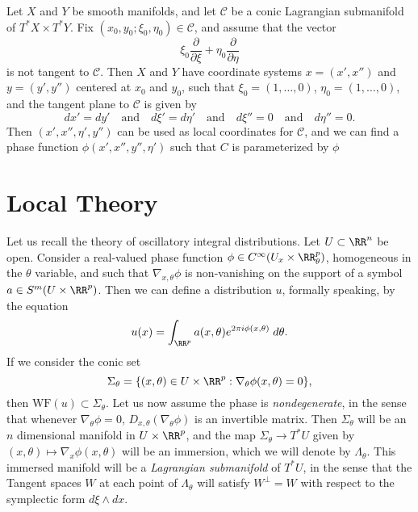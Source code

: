 \begin{lemma}
    Let $X$ and $Y$ be smooth manifolds, and let $\mathcal{C}$ be a conic Lagrangian submanifold of $T^* X \times T^* Y$. Fix $(x_0,y_0;\xi_0,\eta_0) \in \mathcal{C}$, and assume that the vector
    \[ \xi_0 \frac{\partial}{\partial \xi} + \eta_0 \frac{\partial}{\partial \eta} \]
    is not tangent to $\mathcal{C}$. Then $X$ and $Y$ have coordinate systems $x = (x',x'')$ and $y = (y',y'')$ centered at $x_0$ and $y_0$, such that $\xi_0 = (1,\dots,0)$, $\eta_0 = (1,\dots,0)$, and the tangent plane to $\mathcal{C}$ is given by
    \[ dx' = dy' \quad\text{and}\quad d\xi' = d\eta' \quad\text{and}\quad d\xi'' = 0 \quad\text{and}\quad d \eta'' = 0. \]
    Then $(x',x'',\eta',y'')$ can be used as local coordinates for $\mathcal{C}$, and we can find a phase function $\phi(x',x'',y'',\eta')$ such that $C$ is parameterized by $\phi$
\end{lemma}

\section{Local Theory}

Let us recall the theory of oscillatory integral distributions. Let $U \subset \RR^n$ be open. Consider a real-valued phase function $\phi \in C^\infty(U_x \times \RR^p_\theta)$, homogeneous in the $\theta$ variable, and such that $\nabla_{x,\theta} \phi$ is non-vanishing on the support of a symbol $a \in S^m(U \times \RR^p)$. Then we can define a distribution $u$, formally speaking, by the equation
%
\[ u(x) = \int_{\RR^p} a(x,\theta) e^{2 \pi i \phi(x,\theta)}\; d\theta. \]
%
If we consider the conic set
%
\[ \Sigma_\theta = \{ (x,\theta) \in U \times \RR^p : \nabla_\theta \phi(x,\theta) = 0 \}, \]
%
then $\text{WF}(u) \subset \Sigma_\theta$. Let us now assume the phase is \emph{nondegenerate}, in the sense that whenever $\nabla_\theta \phi = 0$, $D_{x,\theta} (\nabla_\theta \phi)$ is an invertible matrix. Then $\Sigma_\theta$ will be an $n$ dimensional manifold in $U \times \RR^p$, and the map $\Sigma_\theta \to T^* U$ given by $(x,\theta) \mapsto \nabla_x \phi(x,\theta)$ will be an immersion, which we will denote by $\Lambda_\theta$. This immersed manifold will be a \emph{Lagrangian submanifold} of $T^* U$, in the sense that the Tangent spaces $W$ at each point of $\Lambda_\theta$ will satisfy $W^\perp = W$ with respect to the symplectic form $d\xi \wedge dx$.

